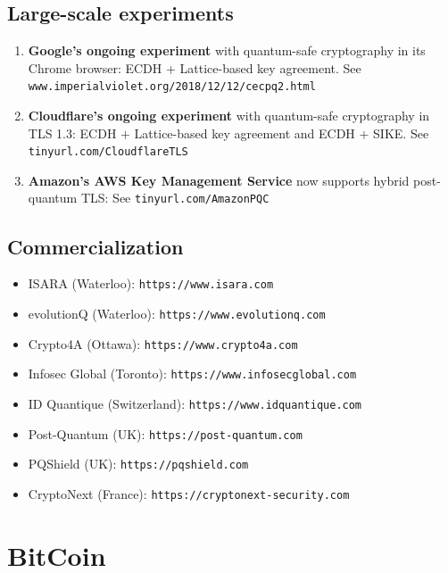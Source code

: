 \documentclass[12pt,titlepage]{article}
\let\stdsection\section
\renewcommand\section{\clearpage\stdsection}
\begin{document}
\subsection{Large-scale experiments}
\begin{enumerate}
	\item \textbf{Google’s ongoing experiment} with quantum-safe cryptography in its Chrome browser: ECDH + Lattice-based key agreement. See \texttt{www.imperialviolet.org/2018/12/12/cecpq2.html}
	\item \textbf{Cloudflare’s ongoing experiment} with quantum-safe cryptography in TLS 1.3: ECDH $+$ Lattice-based key agreement and ECDH $+$ SIKE. See \texttt{tinyurl.com/CloudflareTLS}
	\item \textbf{Amazon’s AWS Key Management Service} now supports hybrid post-quantum TLS: See \texttt{tinyurl.com/AmazonPQC}
\end{enumerate}
\subsection{Commercialization}
\begin{itemize}
	\item ISARA (Waterloo): \texttt{https://www.isara.com}
	\item evolutionQ (Waterloo): \texttt{https://www.evolutionq.com}
	\item Crypto4A (Ottawa): \texttt{https://www.crypto4a.com}
	\item Infosec Global (Toronto): \texttt{https://www.infosecglobal.com}
	\item ID Quantique (Switzerland): \texttt{https://www.idquantique.com}
	\item Post-Quantum (UK): \texttt{https://post-quantum.com}
	\item PQShield (UK): \texttt{https://pqshield.com}
	\item CryptoNext (France): \texttt{https://cryptonext-security.com}
\end{itemize}

\section{BitCoin}
\end{document}

